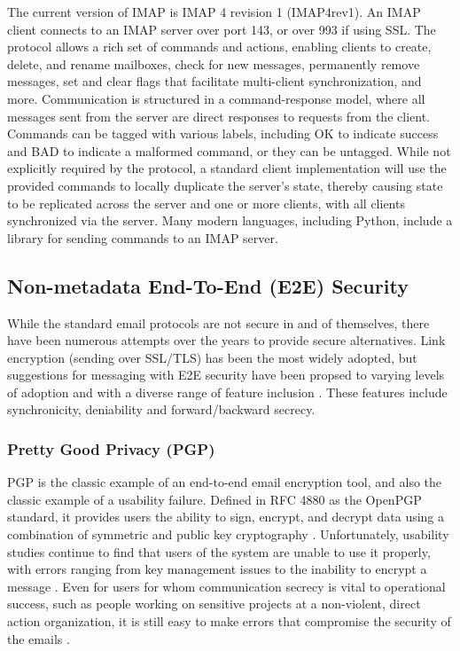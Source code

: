 \documentclass[pageno]{jpaper}
\begin{document}
The current version of IMAP is IMAP 4 revision 1 (IMAP4rev1). An IMAP client connects to an IMAP server over port 143, or over 993 if using SSL. The protocol allows a rich set of commands and actions, enabling clients to create, delete, and rename mailboxes, check for new messages, permanently remove messages, set and clear flags that facilitate multi-client synchronization, and more. Communication is structured in a command-response model, where all messages sent from the server are direct responses to requests from the client. Commands can be tagged with various labels, including OK to indicate success and BAD to indicate a malformed command, or they can be untagged. While not explicitly required by the protocol, a standard client implementation will use the provided commands to locally duplicate the server's state, thereby causing state to be replicated across the server and one or more clients, with all clients synchronized via the server. Many modern languages, including Python, include a library for sending commands to an IMAP server.

\subsection{Non-metadata End-To-End (E2E) Security}
While the standard email protocols are not secure in and of themselves, there have been numerous attempts over the years to provide secure alternatives. Link encryption (sending over SSL/TLS) has been the most widely adopted, but suggestions for messaging with E2E security have been propsed to varying levels of adoption and with a diverse range of feature inclusion \cite{unger2015sok}. These features include synchronicity, deniability and forward/backward secrecy.


\subsubsection{Pretty Good Privacy (PGP)}
PGP is the classic example of an end-to-end email encryption tool, and also the classic example of a usability failure. Defined in RFC 4880 as the OpenPGP standard, it provides users the ability to sign, encrypt, and decrypt data using a combination of symmetric and public key cryptography \cite{callas2007openpgp}. Unfortunately, usability studies continue to find that users of the system are unable to use it properly, with errors ranging from key management issues to the inability to encrypt a message \cite{whitten1999johnny} \cite{sheng2006johnny}. Even for users for whom communication secrecy is vital to operational success, such as people working on sensitive projects at a non-violent, direct action organization, it is still easy to make errors that compromise the security of the emails \cite{gaw2006secrecy}.
\end{document}
